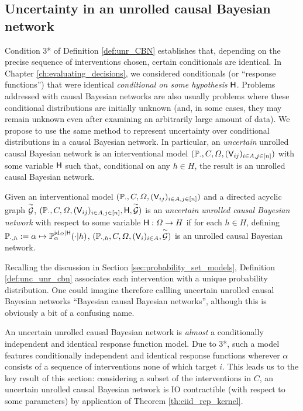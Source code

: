 \subsection{Uncertainty in an unrolled causal Bayesian network}

Condition 3* of Definition \ref{def:unr_CBN} establishes that, depending on the precise sequence of interventions chosen, certain conditionals are identical. In Chapter \ref{ch:evaluating_decisions}, we considered conditionals (or ``response functions'') that were identical \emph{conditional on some hypothesis} $\mathsf{H}$. Problems addressed with causal Bayesian networks are also usually problems where these conditional distributions are initially unknown (and, in some cases, they may remain unknown even after examining an arbitrarily large amount of data). We propose to use the same method to represent uncertainty over conditional distributions in a causal Bayesian network. In particular, an \emph{uncertain} unrolled causal Bayesian network is an interventional model $(\mathbb{P}_\cdot,C,\Omega,(\mathsf{V}_{ij})_{i\in A,j\in [n]})$ with some variable $\mathsf{H}$ such that, conditional on any $h\in H$, the result is an unrolled causal Bayesian network.

\begin{definition}\label{def:unc_unr_cbn}
Given an interventional model $(\mathbb{P}_\cdot,C,\Omega,(\mathsf{V}_{ij})_{i\in A,j\in [n]})$ and a directed acyclic graph $\overset{\sim}{\mathcal{G}}$, $(\mathbb{P}_\cdot,C,\Omega,(\mathsf{V}_{ij})_{i\in A,j\in [n]},\mathsf{H},\overset{\sim}{\mathcal{G}})$ is an \emph{uncertain unrolled causal Bayesian network} with respect to some variable $\mathsf{H}:\Omega\to H$ if for each $h\in H$, defining $\mathbb{P}_{\cdot,h}:= \alpha\mapsto \mathbb{P}_\alpha^{\mathrm{id}_{\Omega}|\mathsf{H}}(\cdot|h)$, $(\mathbb{P}_{\cdot,h},C,\Omega,(\mathsf{V}_i)_{i\in A},\overset{\sim}{\mathcal{G}})$ is an unrolled causal Bayesian network.
\end{definition}

Recalling the discussion in Section \ref{sec:probability_set_models}, Definition \ref{def:unc_unr_cbn} associates each intervention with a unique probability distribution. One could imagine therefore callling uncertain unrolled causal Bayesian networks ``Bayesian causal Bayesian networks'', although this is obviously a bit of a confusing name.

An uncertain unrolled causal Bayesian network is \emph{almost} a conditionally independent and identical response function model. Due to 3*, such a model features conditionally independent and identical response functions wherever $\alpha$ consists of a sequence of interventions none of which target $i$. This leads us to the key result of this section: considering a subset of the interventions in $C$, an uncertain unrolled causal Bayesian network is IO contractible (with respect to some parameters) by application of Theorem \ref{th:ciid_rep_kernel}.

